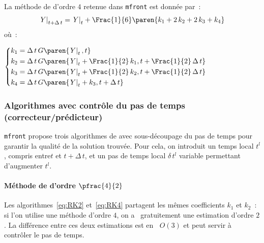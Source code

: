 \documentclass[rectoverso,pleiades,pstricks,leqno,anti]{texmf/note_technique_2010}
\newcommand{\mfront}{\texttt{mfront}}
\newcommand{\bigO}[1]{\ensuremath{\mathop{}\mathopen{}O\mathopen{}\left(#1\right)}}
\newcommand{\debutpas}[1]{\ensuremath{\left.#1\right|_{t}}}
\newcommand{\finpas}[1]{\ensuremath{\left.#1\right|_{t+\Delta\, t}}}
\begin{document}
La méthode de  d'ordre \(4\) retenue dans \mfront{} est
donnée par~:
\begin{equation}
  \label{eq:RK4}
  \finpas{Y} = \debutpas{Y}+\Frac{1}{6}\paren{k_{1}+2\,k_{2}+2\,k_{3}+k_{4}}
\end{equation}
où~:
\begin{minipage}[t]{0.9\linewidth}
  \(
  \left\{
  \begin{aligned}
    k_{1} &= \Delta\,t\,G\paren{\debutpas{Y},t}\\
    k_{2} &= \Delta\,t\,G\paren{\debutpas{Y}+\Frac{1}{2}\,k_{1},t+\Frac{1}{2}\,\Delta\,t}\\
    k_{3} &= \Delta\,t\,G\paren{\debutpas{Y}+\Frac{1}{2}\,k_{2},t+\Frac{1}{2}\,\Delta\,t}\\
    k_{4} &= \Delta\,t\,G\paren{\debutpas{Y}+k_{3},t+\Delta\,t}
  \end{aligned}
  \right.
  \)
\end{minipage}

\subsubsection{Algorithmes avec contrôle du pas de temps (correcteur/prédicteur)}

\mfront{} propose trois algorithmes de  avec
sous-découpage du pas de temps pour garantir la qualité de la solution
trouvée. Pour cela, on introduit un temps local \(t^{l}\), compris
entre\(t\) et \(t+\Delta\,t\), et un pas de temps local
\(\delta\,t^{l}\) variable permettant d'augmenter \(t^{l}\).

\paragraph{Méthode de  d'ordre $\pfrac{4}{2}$} Les
algorithmes~\ref{eq:RK2} et~\ref{eq:RK4} partagent les mêmes
coefficients \(k_{1}\) et \(k_{2}\)~: si l'on utilise une méthode
d'ordre \(4\), on a \og~gratuitement\fg{} une estimation d'ordre \(2\).
La différence entre ces deux estimations est en \(\bigO 3\) et peut
servir à contrôler le pas de temps.
\end{document}
